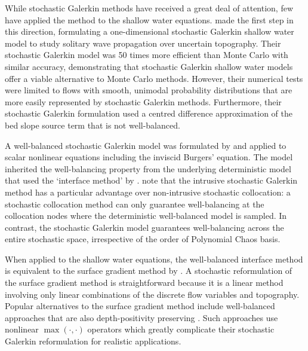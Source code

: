 While stochastic Galerkin methods have received a great deal of attention, few have applied the method to the shallow water equations.
\citet{ge2008} made the first step in this direction, formulating a one-dimensional stochastic Galerkin shallow water model to study solitary wave propagation over uncertain topography.
Their stochastic Galerkin model was 50 times more efficient than Monte Carlo with similar accuracy, demonstrating that stochastic Galerkin shallow water models offer a viable alternative to Monte Carlo methods.
However, their numerical tests were limited to flows with smooth, unimodal probability distributions that are more easily represented by stochastic Galerkin methods.
Furthermore, their stochastic Galerkin formulation used a centred difference approximation of the bed slope source term that is not well-balanced.

A well-balanced stochastic Galerkin model was formulated by \citet{jin2016} and applied to scalar nonlinear equations including the inviscid Burgers' equation.
The model inherited the well-balancing property from the underlying deterministic model that used the `interface method' by \citet{jin2001}.
\citet{jin2016} note that the intrusive stochastic Galerkin method has a particular advantage over non-intrusive stochastic collocation:
a stochastic collocation method can only guarantee well-balancing at the collocation nodes where the deterministic well-balanced model is sampled.
In contrast, the stochastic Galerkin model guarantees well-balancing across the entire stochastic space, irrespective of the order of Polynomial Chaos basis.

When applied to the shallow water equations, the well-balanced interface method is equivalent to the surface gradient method by \citet{zhou2001}.
A stochastic reformulation of the surface gradient method is straightforward because it is a linear method involving only linear combinations of the discrete flow variables and topography.
Popular alternatives to the surface gradient method include well-balanced approaches that are also depth-positivity preserving \citep{audusse2004,liang-marche2009}.
Such approaches use nonlinear $\max(\cdot, \cdot)$ operators which greatly complicate their stochastic Galerkin reformulation for realistic applications.

